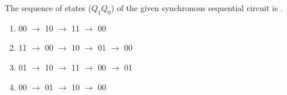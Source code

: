 The sequence of states ($Q_1Q_0$) of the given synchronous sequential circuit is \makebox[4em]{\hrulefill}.

\hfill{}



\begin{enumerate}[label=(\Alph*)]
    \item 00 $\to$ 10 $\to$ 11 $\to$ 00
    \item 11 $\to$ 00 $\to$ 10 $\to$ 01 $\to$ 00
    \item 01 $\to$ 10 $\to$ 11 $\to$ 00 $\to$ 01
    \item 00 $\to$ 01 $\to$ 10 $\to$ 00
\end{enumerate}